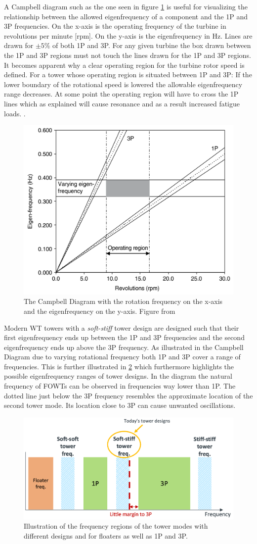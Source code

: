 A Campbell diagram such as the one seen in figure \cref{fig:campbell} is useful for visualizing the relationship between the allowed eigenfrequency of a component and the 1P and 3P frequencies. On the x-axis is the operating frequency of the turbine in revolutions per minute [rpm]. On the y-axis is the eigenfrequency in Hz. Lines are drawn for $ \pm 5 \% $ of both 1P and 3P. For any given turbine the box drawn between the 1P and 3P regions must not touch the lines drawn for the 1P and 3P regions. It becomes apparent why a clear operating region for the turbine rotor speed is defined. For a tower whose operating region is situated between 1P and 3P: If the lower boundary of the rotational speed is lowered the allowable eigenfrequency range decreases. At some point the operating region will have to cross the 1P lines which as explained will cause resonance and as a result increased fatigue loads. \cite{Valentine2015}.
\begin{figure}[ht]
	\centering
	\includegraphics[width=0.5\linewidth]{Graphics/CampbellDiagram.PNG}
	\caption{The Campbell Diagram with the rotation frequency on the x-axis and the eigenfrequency on the y-axis. Figure from \cite{Valentine2015}}
	\label{fig:campbell}
\end{figure}
Modern WT towers with a \textit{soft-stiff} tower design are designed such that their first eigenfrequency ends up between the 1P and 3P frequencies and the second eigenfrequency ends up above the 3P frequency. As illustrated in the Campbell Diagram due to varying rotational frequency both 1P and 3P cover a range of frequencies. This is further illustrated in \cref{fig:1p_and3p} which furthermore highlights the possible eigenfrequency ranges of tower designs. In the diagram the natural frequency of FOWTs can be observed in frequencies way lower than 1P. The dotted line  just below the 3P frequency resembles the approximate location of the second tower mode. Its location close to 3P can cause unwanted oscillations.
\begin{figure}[ht]
	\centering
	\includegraphics[width=0.7\linewidth]{Graphics/1Pand3PvsTwrStiff.PNG}
	\caption{Illustration of the frequency regions of the tower modes with different designs and for floaters as well as 1P and 3P.}
	\label{fig:1p_and3p}
\end{figure}
